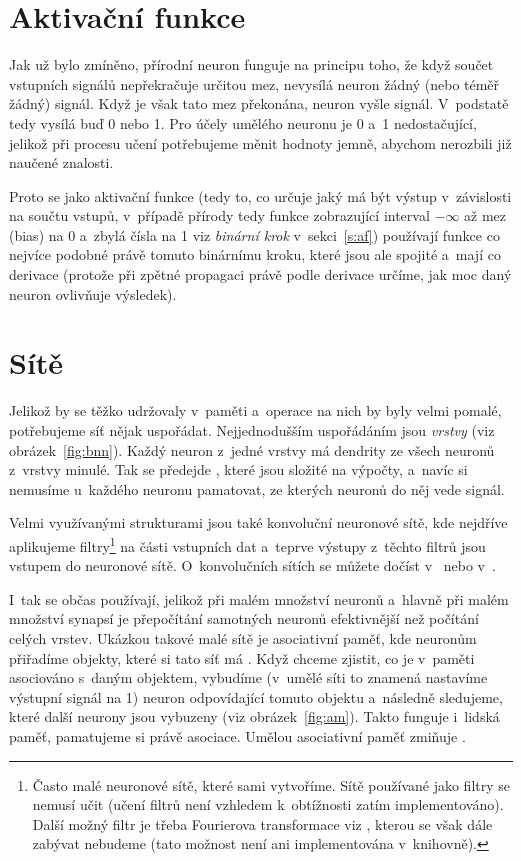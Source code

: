 \documentclass[12pt]{report}			%
\begin{document}
				\section{Aktivační funkce}
					Jak už bylo zmíněno, přírodní neuron funguje na principu toho, že když součet vstupních signálů nepřekračuje určitou mez, nevysílá neuron žádný (nebo téměř žádný) signál. Když je však tato mez překonána, neuron vyšle signál. V~podstatě tedy vysílá buď 0 nebo 1. Pro účely umělého neuronu je 0 a~1 nedostačující, jelikož při procesu učení potřebujeme měnit hodnoty jemně, abychom nerozbili již naučené znalosti.
					
					Proto se jako aktivační funkce (tedy to, co určuje jaký má být výstup v~závislosti na součtu vstupů, v~případě přírody tedy funkce zobrazující interval $-\infty$ až mez (bias) na 0 a~zbylá čísla na 1 viz \emph{binární krok} v~sekci~\ref{s:af}) používají funkce co nejvíce podobné právě tomuto binárnímu kroku, které jsou ale spojité a~mají co  derivace (protože při zpětné propagaci právě podle derivace určíme, jak moc daný neuron ovlivňuje výsledek).
				
				\section{Sítě} \label{s:net}
					Jelikož  by se těžko udržovaly v~paměti a~operace na nich by byly velmi pomalé, potřebujeme síť nějak uspořádat. Nejjednodušším uspořádáním jsou \emph{vrstvy} (viz obrázek~\ref{fig:bnn}). Každý neuron z~jedné vrstvy má \gls{dendrit}y ze všech neuronů z~vrstvy minulé. Tak se předejde , které jsou složité na výpočty, a~navíc si nemusíme u~každého neuronu pamatovat, ze kterých neuronů do něj vede signál.
					
					Velmi využívanými strukturami jsou také konvoluční neuronové sítě, kde nejdříve aplikujeme filtry\footnote{Často malé neuronové sítě, které sami vytvoříme. Sítě používané jako filtry se nemusí učit (učení filtrů není vzhledem k~obtížnosti zatím implementováno). Další možný filtr je třeba Fourierova transformace viz \autocite{art:FCNN}, kterou se však dále zabývat nebudeme (tato možnost není ani implementována v~knihovně).} na části vstupních dat a~teprve výstupy z~těchto filtrů jsou vstupem do neuronové sítě. O~konvolučních sítích se můžete dočíst v~\autocite{lec:CNN} nebo v~\autocite{sem:CNN}.
					
					I~tak se  občas používají, jelikož při malém množství neuronů a~hlavně při malém množství synapsí je přepočítání samotných neuronů efektivnější než počítání celých vrstev. Ukázkou takové malé sítě je asociativní paměť, kde neuronům přiřadíme objekty, které si tato síť má . Když chceme zjistit, co je v~paměti asociováno s~daným objektem, vybudíme (v~umělé síti to znamená nastavíme výstupní signál na 1) neuron odpovídající tomuto objektu a~následně sledujeme, které další neurony jsou vybuzeny (viz obrázek~\ref{fig:am}). Takto funguje i~lidská paměť, pamatujeme si právě asociace. Umělou asociativní paměť zmiňuje \autocite{book:Informatika}.
					
\end{document}
